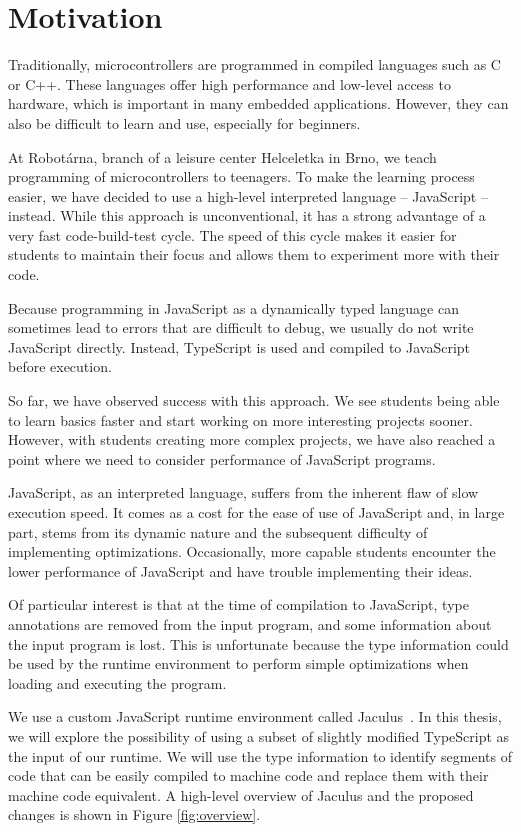 \chapter{Motivation}

Traditionally, microcontrollers are programmed in compiled languages such as C or C++. These languages offer high performance and low-level access to hardware, which is important in many embedded applications. However, they can also be difficult to learn and use, especially for beginners.

At Robotárna, branch of a leisure center Helceletka in Brno, we teach programming of microcontrollers to teenagers. To make the learning process easier, we have decided to use a high-level interpreted language -- JavaScript -- instead. While this approach is unconventional, it has a strong advantage of a very fast code-build-test cycle. The speed of this cycle makes it easier for students to maintain their focus and allows them to experiment more with their code.

Because programming in JavaScript as a dynamically typed language can sometimes lead to errors that are difficult to debug, we usually do not write JavaScript directly. Instead, TypeScript is used and compiled to JavaScript before execution.

So far, we have observed success with this approach. We see students being able to learn basics faster and start working on more interesting projects sooner. However, with students creating more complex projects, we have also reached a point where we need to consider performance of JavaScript programs.

JavaScript, as an interpreted language, suffers from the inherent flaw of slow execution speed. It comes as a cost for the ease of use of JavaScript and, in large part, stems from its dynamic nature and the subsequent difficulty of implementing optimizations. Occasionally, more capable students encounter the lower performance of JavaScript and have trouble implementing their ideas.

Of particular interest is that at the time of compilation to JavaScript, type annotations are removed from the input program, and some information about the input program is lost. This is unfortunate because the type information could be used by the runtime environment to perform simple optimizations when loading and executing the program.

We use a custom JavaScript runtime environment called Jaculus~\cite{jaculusthesis}. In this thesis, we will explore the possibility of using a subset of slightly modified TypeScript as the input of our runtime. We will use the type information to identify segments of code that can be easily compiled to machine code and replace them with their machine code equivalent. A high-level overview of Jaculus and the proposed changes is shown in Figure \ref{fig:overview}.

